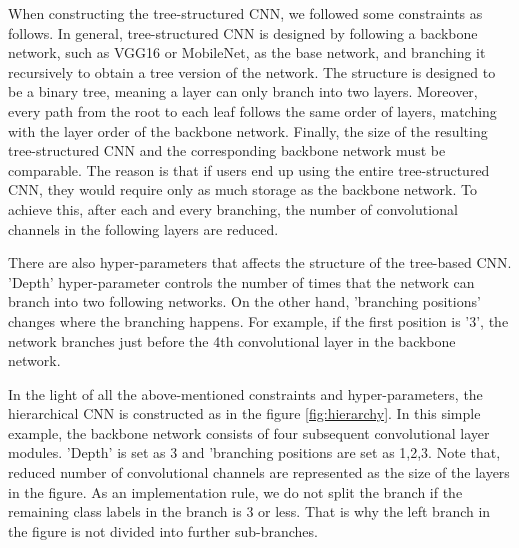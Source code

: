 When constructing the tree-structured CNN, we followed some constraints as follows. 
In general, tree-structured CNN is designed by following a backbone network, such as VGG16 or MobileNet, as the base network, and branching it recursively to obtain a tree version of the network.
The structure is designed to be a binary tree, meaning a layer can only branch into two layers. 
Moreover, every path from the root to each leaf follows the same order of layers, matching with the layer order of the backbone network.
Finally, the size of the resulting tree-structured CNN and the corresponding backbone network must be comparable. 
The reason is that if users end up using the entire tree-structured CNN, they would require only as much storage as the backbone network.
To achieve this, after each and every branching, the number of convolutional channels in the following layers are reduced.

There are also hyper-parameters that affects the structure of the tree-based CNN. 
'Depth' hyper-parameter controls the number of times that the network can branch into two following networks. 
On the other hand, 'branching positions' changes where the branching happens.
For example, if the first position is '3', the network branches just before the 4th convolutional layer in the backbone network.

In the light of all the above-mentioned constraints and hyper-parameters, the hierarchical CNN is constructed as in the figure \ref{fig:hierarchy}. 
In this simple example, the backbone network consists of four subsequent convolutional layer modules. 
'Depth' is set as 3 and 'branching positions are set as 1,2,3. 
Note that, reduced number of convolutional channels are represented as the size of the layers in the figure.
As an implementation rule, we do not split the branch if the remaining class labels in the branch is 3 or less. 
That is why the left branch in the figure is not divided into further sub-branches.


